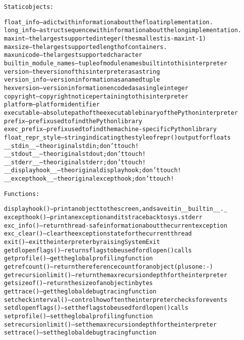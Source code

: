 \begin{alltt}
Static objects:

float\_info -- a dict with information about the float inplementation.
long\_info -- a struct sequence with information about the long implementation.
maxint -- the largest supported integer (the smallest is -maxint-1)
maxsize -- the largest supported length of containers.
maxunicode -- the largest supported character
builtin\_module\_names -- tuple of module names built into this interpreter
version -- the version of this interpreter as a string
version\_info -- version information as a named tuple
hexversion -- version information encoded as a single integer
copyright -- copyright notice pertaining to this interpreter
platform -- platform identifier
executable -- absolute path of the executable binary of the Python interpreter
prefix -- prefix used to find the Python library
exec\_prefix -- prefix used to find the machine-specific Python library
float\_repr\_style -- string indicating the style of repr() output for floats
\_\_stdin\_\_ -- the original stdin; don't touch!
\_\_stdout\_\_ -- the original stdout; don't touch!
\_\_stderr\_\_ -- the original stderr; don't touch!
\_\_displayhook\_\_ -- the original displayhook; don't touch!
\_\_excepthook\_\_ -- the original excepthook; don't touch!

Functions:

displayhook() -- print an object to the screen, and save it in \_\_builtin\_\_.\_
excepthook() -- print an exception and its traceback to sys.stderr
exc\_info() -- return thread-safe information about the current exception
exc\_clear() -- clear the exception state for the current thread
exit() -- exit the interpreter by raising SystemExit
getdlopenflags() -- returns flags to be used for dlopen() calls
getprofile() -- get the global profiling function
getrefcount() -- return the reference count for an object (plus one :-)
getrecursionlimit() -- return the max recursion depth for the interpreter
getsizeof() -- return the size of an object in bytes
gettrace() -- get the global debug tracing function
setcheckinterval() -- control how often the interpreter checks for events
setdlopenflags() -- set the flags to be used for dlopen() calls
setprofile() -- set the global profiling function
setrecursionlimit() -- set the max recursion depth for the interpreter
settrace() -- set the global debug tracing function
\end{alltt}



